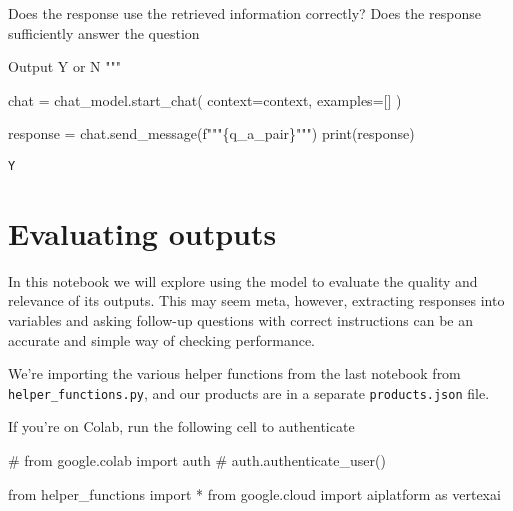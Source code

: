 \documentclass[
  letterpaper,
  DIV=11,
  numbers=noendperiod]{scrreprt}
\newenvironment{Shaded}{\begin{snugshade}}{\end{snugshade}}
\newcommand{\BuiltInTok}[1]{\textcolor[rgb]{0.00,0.23,0.31}{#1}}
\newcommand{\CommentTok}[1]{\textcolor[rgb]{0.37,0.37,0.37}{#1}}
\newcommand{\ImportTok}[1]{\textcolor[rgb]{0.00,0.46,0.62}{#1}}
\newcommand{\NormalTok}[1]{\textcolor[rgb]{0.00,0.23,0.31}{#1}}
\newcommand{\OperatorTok}[1]{\textcolor[rgb]{0.37,0.37,0.37}{#1}}
\newcommand{\SpecialCharTok}[1]{\textcolor[rgb]{0.37,0.37,0.37}{#1}}
\newcommand{\SpecialStringTok}[1]{\textcolor[rgb]{0.13,0.47,0.30}{#1}}
\begin{document}
\begin{Shaded}
\begin{Highlighting}[]
\SpecialStringTok{Does the response use the retrieved information correctly?}
\SpecialStringTok{Does the response sufficiently answer the question}

\SpecialStringTok{Output Y or N}
\SpecialStringTok{"""}

\NormalTok{chat }\OperatorTok{=}\NormalTok{ chat\_model.start\_chat(}
\NormalTok{    context}\OperatorTok{=}\NormalTok{context,}
\NormalTok{    examples}\OperatorTok{=}\NormalTok{[]}
\NormalTok{)}

\NormalTok{response }\OperatorTok{=}\NormalTok{ chat.send\_message(}\SpecialStringTok{f"""}\SpecialCharTok{\{}\NormalTok{q\_a\_pair}\SpecialCharTok{\}}\SpecialStringTok{"""}\NormalTok{)}
\BuiltInTok{print}\NormalTok{(response)}
\end{Highlighting}
\end{Shaded}

\begin{verbatim}
Y
\end{verbatim}


\hypertarget{evaluating-outputs}{%
\chapter{Evaluating outputs}\label{evaluating-outputs}}

In this notebook we will explore using the model to evaluate the quality
and relevance of its outputs. This may seem meta, however, extracting
responses into variables and asking follow-up questions with correct
instructions can be an accurate and simple way of checking performance.

We're importing the various helper functions from the last notebook from
\texttt{helper\_functions.py}, and our products are in a separate
\texttt{products.json} file.

If you're on Colab, run the following cell to authenticate

\begin{Shaded}
\begin{Highlighting}[]
\CommentTok{\# from google.colab import auth}
\CommentTok{\# auth.authenticate\_user()}
\end{Highlighting}
\end{Shaded}

\begin{Shaded}
\begin{Highlighting}[]
\ImportTok{from}\NormalTok{ helper\_functions }\ImportTok{import} \OperatorTok{*}
\ImportTok{from}\NormalTok{ google.cloud }\ImportTok{import}\NormalTok{ aiplatform }\ImportTok{as}\NormalTok{ vertexai}
\end{Highlighting}
\end{Shaded}
\end{document}
